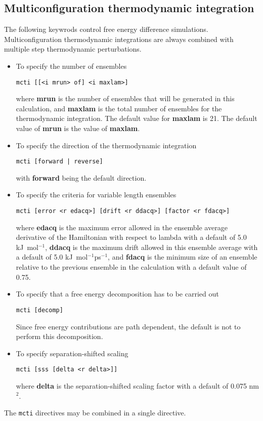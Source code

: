 \subsection{Multiconfiguration thermodynamic integration}
The following keywrods control free energy difference simulations.
Multiconfiguration thermodynamic integrations are always combined
with multiple step thermodynamic perturbations.
\begin{itemize}
\item
To specify the number of ensembles
\begin{verbatim}
mcti [[<i mrun> of] <i maxlam>] 
\end{verbatim}
where {\bf mrun} is the number of ensembles that will be generated in
this calculation, and {\bf maxlam} is the total number of ensembles
for the thermodynamic integration. The default value for {\bf maxlam}
is 21. The default value of {\bf mrun} is the value of {\bf maxlam}.
\item
To specify the direction of the thermodynamic integration
\begin{verbatim}
mcti [forward | reverse] 
\end{verbatim}
with {\bf forward} being the default direction.
\item
To specify the criteria for variable length ensembles
\begin{verbatim}
mcti [error <r edacq>] [drift <r ddacq>] [factor <r fdacq>]
\end{verbatim}
where {\bf edacq} is the maximum error allowed in the ensemble average 
derivative of the Hamiltonian with respect to lambda with a default
of 5.0 kJ~mol$^{-1}$, {\bf ddacq} is the maximum drift allowed in this
ensemble average with a default of 5.0 kJ~mol$^{-1}$ps$^{-1}$, and
{\bf fdacq} is the minimum size of an ensemble relative to the
previous ensemble in the calculation with a default value of 0.75.
\item
To specify that a free energy decomposition has to be carried out
\begin{verbatim}
mcti [decomp]
\end{verbatim}
Since free energy contributions are path dependent, the default is not
to perform this decomposition.
\item
To specify separation-shifted scaling
\begin{verbatim}
mcti [sss [delta <r delta>]]
\end{verbatim}
where {\bf delta} is the separation-shifted scaling factor with a default
of 0.075 nm$^2$.
\end{itemize}
The \verb+mcti+ directives may be combined in a single directive.
